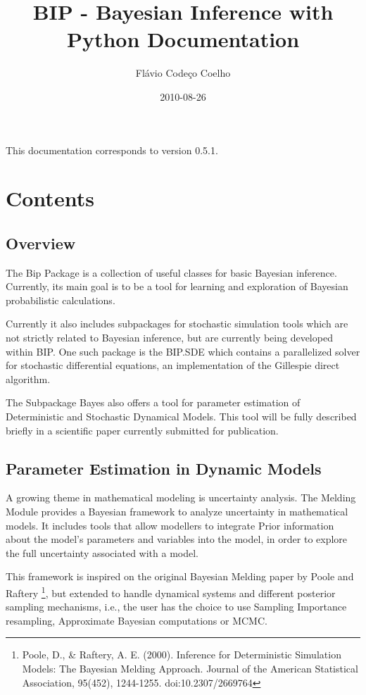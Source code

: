 \documentclass[a4paper,10pt,english]{sphinxmanual}
\title{BIP - Bayesian Inference with Python Documentation}
\date{2010-08-26}
\author{Flávio Codeço Coelho}
\begin{document}
\maketitle
\tableofcontents
{}\label{index::doc}


This documentation corresponds to version 0.5.1.


\chapter{Contents}
\label{index:contents}\label{index:welcome-to-bip-bayesian-inference-with-python-s-documentation}

\section{Overview}
\label{overview:overview}\label{overview::doc}
The Bip Package is a collection of useful classes for basic Bayesian inference. Currently, its main goal is to be a tool for learning and exploration of Bayesian probabilistic calculations.

Currently it also includes subpackages for stochastic simulation tools which are not strictly related to Bayesian inference, but are currently being developed within BIP. One such package is the BIP.SDE which contains a parallelized solver for stochastic differential equations, an implementation of the Gillespie direct algorithm.

The Subpackage Bayes also offers a tool for parameter estimation of Deterministic and Stochastic Dynamical Models. This tool will be fully described briefly in a scientific paper currently submitted for publication.


\section{Parameter Estimation in Dynamic Models}
\label{paramest:parameter-estimation-in-dynamic-models}\label{paramest::doc}
A growing theme in mathematical modeling is uncertainty analysis. The Melding Module provides a Bayesian framework to analyze uncertainty in mathematical models. It includes tools that allow modellers to integrate Prior information about the model's parameters and variables into the model, in order to explore the full uncertainty associated with a model.

This framework is inspired on the original Bayesian Melding paper by Poole and Raftery \footnote{
Poole, D., \& Raftery, A. E. (2000). Inference for Deterministic Simulation Models: The Bayesian Melding Approach. Journal of the American Statistical Association, 95(452), 1244-1255. doi:10.2307/2669764
}, but extended to handle dynamical systems and different posterior sampling mechanisms, i.e., the user has the choice to use Sampling Importance resampling, Approximate Bayesian computations or MCMC.
\end{document}
